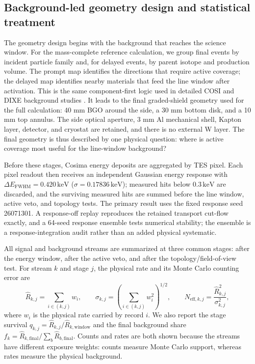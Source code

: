 \documentclass[11pt]{article}
\newcommand{\keV}{\ensuremath{\,\mathrm{keV}}}
\begin{document}
\subsection{Background-led geometry design and statistical treatment}
\label{subsec:comparison_hierarchy}

The geometry design begins with the background that reaches the science window.
For the mass-complete reference calculation, we group final events by incident
particle family and, for delayed events, by parent isotope and production volume.
The prompt map identifies the directions that require active coverage; the delayed
map identifies nearby materials that feed the line window after activation. This is
the same component-first logic used in detailed COSI and DIXE background studies
\cite{Gallego2025Balloon,Tian2026DIXE}. It leads to the final graded-shield geometry used for
the full calculation: 40 mm BGO around the side, a 30 mm bottom disk, and a 10 mm
top annulus. The side optical aperture, 3 mm Al mechanical shell, Kapton layer,
detector, and cryostat are retained, and there is no external W layer. The final
geometry is thus described by one physical question: where is active coverage most
useful for the line-window background?

Before these stages, Cosima energy deposits are aggregated by TES pixel. Each
pixel readout then receives an independent Gaussian energy response with
$\Delta E_{\mathrm{FWHM}}=0.420\keV$ ($\sigma=0.17836\keV$); measured hits below
$0.3\keV$ are discarded, and the surviving measured hits are summed before the
line window, active veto, and topology tests. The primary result uses the fixed
response seed 26071301. A response-off replay reproduces the retained transport
cut-flow exactly, and a 64-seed response ensemble tests numerical stability; the
ensemble is a response-integration audit rather than an added physical systematic.

All signal and background streams are summarized at three common stages: after the
energy window, after the active veto, and after the topology/field-of-view test. For
stream $k$ and stage $j$, the physical rate and its Monte Carlo counting error are
\begin{equation}
  \widehat R_{k,j}=\sum_{i\in(k,j)} w_i,
  \qquad
  \sigma_{k,j}=\left(\sum_{i\in(k,j)} w_i^2\right)^{1/2},
  \qquad
  N_{\mathrm{eff},k,j}=\frac{\widehat R_{k,j}^{2}}{\sigma_{k,j}^{2}},
  \label{eq:weighted_rate_stats}
\end{equation}
where $w_i$ is the physical rate carried by record $i$. We also report the stage
survival $q_{k,j}=\widehat R_{k,j}/\widehat R_{k,\mathrm{window}}$ and the final
background share $f_k=\widehat R_{k,\mathrm{final}}/\sum_b
\widehat R_{b,\mathrm{final}}$. Counts and rates are both shown because the streams
have different exposure weights: counts measure Monte Carlo support, whereas rates
measure the physical background.
\end{document}
